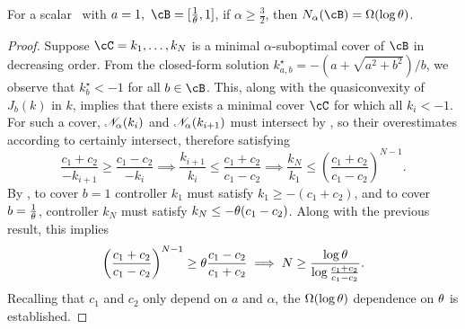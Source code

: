 \begin{theorem}
\label{thm:scalar-lb}
	For a scalar \DDFproblem\ with
	$a = 1,\ \cB = [\recip \breadth, 1]$,
	if $\alpha \geq \frac 3 2$, %
	then
	$\coveringnum{\alpha}{\cB} = \Omega(\log \breadth)$.
\end{theorem}
\begin{proof}
	Suppose $\coveringset = k_1, \dots, k_N$ is a minimal $\alpha$-suboptimal cover of $\cB$
	in decreasing order.
	From the closed-form solution
	\(
		k^\star_{a,b} = -(a + \sqrt{a^2 + b^2})/b
	\),
	we observe that $k^\star_b < -1$ for all $b \in \cB$.
	This, along with the quasiconvexity of $J_b(k)$ in $k$,
	implies that there exists a minimal cover $\coveringset$ for which all $k_i < -1$.
	For such a cover,
	$\mathscr{N}_{\alpha}(k_i)$
	and
	$\mathscr{N}_{\alpha}(k_{i+1})$
	must intersect
	by ,
	so their overestimates according to
	certainly intersect,
	therefore satisfying
	\[
		\frac{c_1 + c_2}{-k_{i+1}}
		\geq
		\frac{c_1 - c_2}{-k_i}
		\implies
		\frac{k_{i+1}}{k_i} \leq \frac{c_1 + c_2}{c_1 - c_2}
		\implies
		\frac{k_N}{k_1} \leq \left(\frac{c_1 + c_2}{c_1 - c_2}\right)^{N-1}.
	\]
	By ,
	to cover $b = 1$
	controller $k_1$ must satisfy
	$k_1 \geq -(c_1 + c_2)$,
	and to cover $b = \frac{1}{\theta}$,
	controller $k_N$ must satisfy
	$k_N \leq -\theta(c_1 - c_2)$.
	Along with the previous result, this implies
	\[
		\left(\frac{c_1 + c_2}{c_1 - c_2}\right)^{N-1}
		\geq
		\theta
		\frac{c_1 - c_2}{c_1 + c_2}
		\implies
		N \geq \frac{\log \theta}{\log \frac{c_1 + c_2}{c_1 - c_2}}.
	\]
	Recalling that $c_1$ and $c_2$ only depend on $a$ and $\alpha$,
	the $\Omega(\log \theta)$ dependence on $\theta$ is established.
\end{proof}









